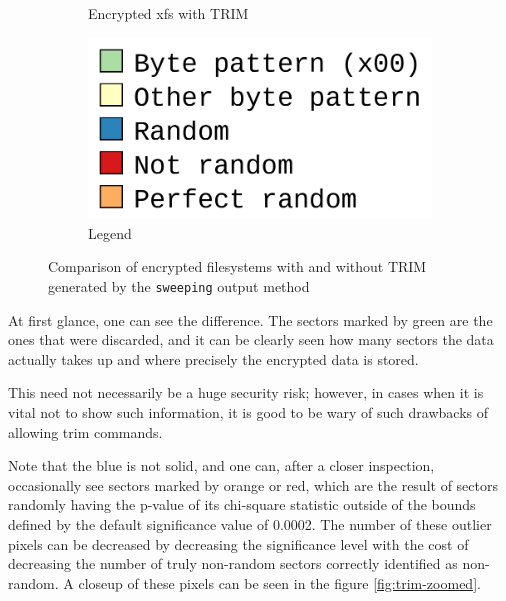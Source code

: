 \documentclass[
  digital, %
  color,   %
  oneside, %
  lof,     %
  nolot,     %
]{fithesis4}
\begin{document}
\begin{figure}
\begin{subfigure}[b]{0.45\textwidth}
    \caption{Encrypted xfs with TRIM}
    \label{fig:trim-xfs-trim}
  \end{subfigure}
  \begin{subfigure}[b]{0.45\textwidth}
    \centering
    \includegraphics[width=\textwidth]{legend.png}
    \caption{Legend}
    \label{fig:trim-legend1}
  \end{subfigure}
  \caption{Comparison of encrypted filesystems with and without TRIM generated by the \texttt{sweeping} output method}
  \label{fig:trim-comparison}
\end{figure}

At first glance, one can see the difference.
The sectors marked by green are the ones that were discarded, and it can be clearly seen how many sectors the data actually takes up and where precisely the encrypted data is stored.

This need not necessarily be a huge security risk; however, in cases when it is vital not to show such information, it is good to be wary of such drawbacks of allowing trim commands.

Note that the blue is not solid, and one can, after a closer inspection, occasionally see sectors marked by orange or red, which are the result of sectors randomly having the p-value of its chi-square statistic outside of the bounds defined by the default significance value of 0.0002.
The number of these outlier pixels can be decreased by decreasing the significance level with the cost of decreasing the number of truly non-random sectors correctly identified as non-random.
A closeup of these pixels can be seen in the figure \ref{fig:trim-zoomed}.
\end{document}

